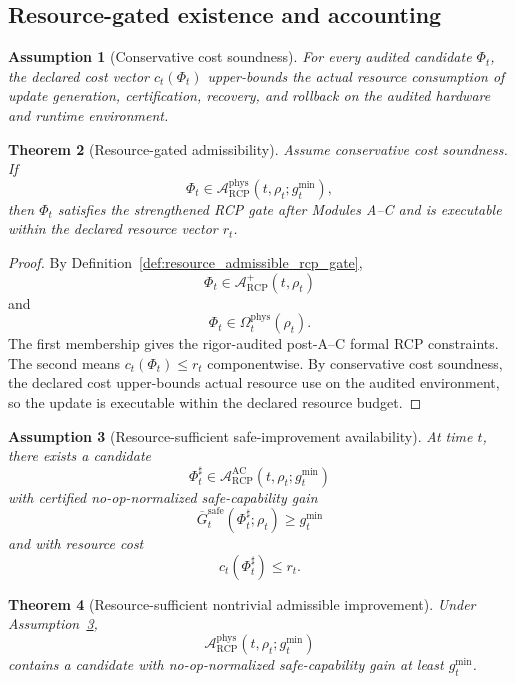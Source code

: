 \documentclass[11pt]{article}
\newtheorem{theorem}{Theorem}[section]
\newtheorem{assumption}[theorem]{Assumption}
\newcommand{\Acal}{\mathcal{A}}
\newcommand{\1}{\mathbf{1}}
\newcommand{\RCP}{\mathrm{RCP}}
\newcommand{\safe}{\mathrm{safe}}
\providecommand{\AC}{\mathrm{AC}}
\providecommand{\phys}{\mathrm{phys}}
\begin{document}
\subsection{Resource-gated existence and accounting}

\begin{assumption}[Conservative cost soundness]
\label{ass:conservative_cost_soundness}
For every audited candidate \(\Phi_t\), the declared cost vector \(c_t(\Phi_t)\) upper-bounds the actual resource consumption of update generation, certification, recovery, and rollback on the audited hardware and runtime environment.
\end{assumption}

\begin{theorem}[Resource-gated admissibility]
\label{thm:resource_gated_admissibility}
Assume conservative cost soundness.  If
\[
\Phi_t\in\Acal_{\RCP}^{\phys}(t,\rho_t;g_t^{\min}),
\]
then \(\Phi_t\) satisfies the strengthened RCP gate after Modules A--C and is executable within the declared resource vector \(r_t\).
\end{theorem}

\begin{proof}
By Definition~\ref{def:resource_admissible_rcp_gate},
\[
\Phi_t\in\Acal_{\RCP}^{+}(t,\rho_t)
\]
and
\[
\Phi_t\in\Omega_t^{\phys}(\rho_t).
\]
The first membership gives the rigor-audited post-A--C formal RCP constraints.  The second means \(c_t(\Phi_t)\le r_t\) componentwise.  By conservative cost soundness, the declared cost upper-bounds actual resource use on the audited environment, so the update is executable within the declared resource budget.
\end{proof}

\begin{assumption}[Resource-sufficient safe-improvement availability]
\label{ass:resource_sufficient_safe_improvement_availability}
At time \(t\), there exists a candidate
\[
\Phi_t^\sharp\in\Acal_{\RCP}^{\AC}(t,\rho_t;g_t^{\min})
\]
with certified no-op-normalized safe-capability gain
\[
\overline G_t^{\safe}(\Phi_t^\sharp;\rho_t)
\ge g_t^{\min}
\]
and with resource cost
\[
c_t(\Phi_t^\sharp)\le r_t.
\]
\end{assumption}

\begin{theorem}[Resource-sufficient nontrivial admissible improvement]
\label{thm:resource_sufficient_nontrivial_improvement}
Under Assumption~\ref{ass:resource_sufficient_safe_improvement_availability},
\[
\Acal_{\RCP}^{\phys}(t,\rho_t;g_t^{\min})
\]
contains a candidate with no-op-normalized safe-capability gain at least \(g_t^{\min}\).
\end{theorem}
\end{document}
